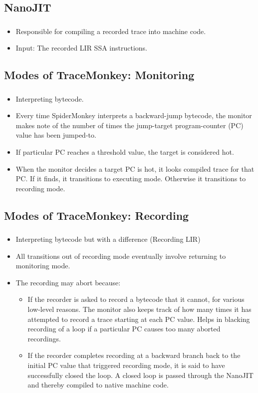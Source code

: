 \documentclass[mathserif,10pt]{beamer}
\begin{document}
\subsection{NanoJIT}
\frame
{
  \frametitle{\subsecname}
  \begin{itemize}
    \item Responsible for compiling a recorded trace into machine code.
    \item Input: The recorded LIR SSA instructions.
  \end{itemize}  
}


\subsection{Modes of TraceMonkey: Monitoring}
\frame
{
  \frametitle{\subsecname}
  \begin{itemize} 
  \item Interpreting bytecode. 
  \item Every time SpiderMonkey interprets a backward-jump bytecode, the monitor makes note of the number
    of times the jump-target program-counter (PC) value has been jumped-to.
   \item  If particular PC reaches a threshold value, the target is considered hot.
    \item When the monitor decides a target PC is hot, it looks compiled trace for that PC. If it finds, it transitions to executing mode. Otherwise it transitions to recording mode.
  \end{itemize}  
}

\subsection{Modes of TraceMonkey: Recording}
\frame
{
  \frametitle{\subsecname}
  \begin{itemize} 
  \item Interpreting bytecode but with a difference (Recording LIR) 
  \item All transitions out of recording mode eventually involve returning to monitoring mode.  
  \item The recording may abort because: 
    \begin{itemize} 
      \item If the recorder is asked to record a bytecode that it cannot, for various low-level reasons. 
        The monitor also keeps track of how many times it has attempted to record a trace starting at each PC value. Helps in blacking recording of a loop  if a particular PC causes too many aborted recordings.
      \item If the recorder completes recording at a backward branch back to the initial PC value that triggered recording mode, it is said to have successfully closed the loop. A closed loop is passed through the NanoJIT  and thereby compiled to native machine code. 

    \end{itemize}  
  \end{itemize}  
}
\end{document}
